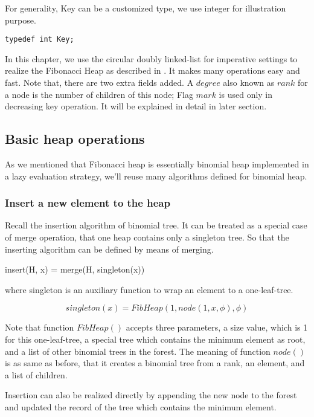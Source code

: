 \documentclass{article}
\begin{document}
For generality, Key can be a customized type, we use integer for illustration
purpose.

\lstset{language=C}
\begin{lstlisting}
typedef int Key;
\end{lstlisting}

In this chapter, we use the circular doubly linked-list for imperative
settings to realize the Fibonacci Heap as described in \cite{CLRS}.
It makes many operations easy and fast. Note that, there are two extra
fields added. A $degree$ also known as $rank$ for a node is the number
of children of this node; Flag $mark$ is used only in decreasing key
operation. It will be explained in detail in later section.


\subsection{Basic heap operations}
As we mentioned that Fibonacci heap is essentially binomial heap 
implemented in a lazy evaluation strategy, we'll reuse many algorithms
defined for binomial heap.

\subsubsection{Insert a new element to the heap}
Recall the insertion algorithm of binomial  tree. It can be treated
as a special case of merge operation, that one heap contains only
a singleton tree. So that the inserting algorithm can be defined
by means of merging.

\be
insert(H, x) = merge(H, singleton(x))
\label{eq:fib-insert}
\ee

where singleton is an auxiliary function to wrap an element to a
one-leaf-tree.

\[
singleton(x) = FibHeap(1, node(1, x, \phi), \phi)
\]

Note that function $FibHeap()$ accepts three parameters, a
size value, which is 1 for this one-leaf-tree, a special tree
which contains the minimum element as root, and a list of other
binomial trees in the forest. The meaning of function $node()$ is
as same as before, that it creates a binomial tree from a rank,
an element, and a list of children.

Insertion can also be realized directly by appending the new node
to the forest and updated the record of the tree which contains the
minimum element.
\end{document}
